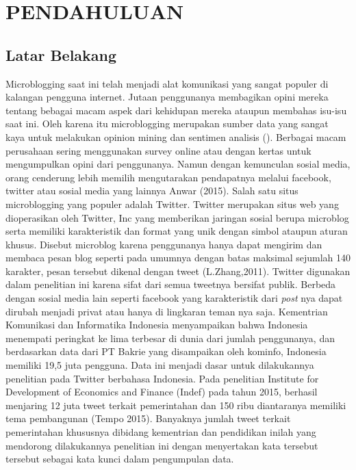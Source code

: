 \section*{PENDAHULUAN} %
\subsection*{Latar Belakang}
Microblogging saat ini telah menjadi alat komunikasi yang sangat populer di kalangan pengguna internet. Jutaan penggunanya membagikan opini mereka tentang bebagai macam aspek dari kehidupan mereka ataupun membahas isu-isu saat ini. Oleh karena itu microblogging merupakan sumber data yang sangat kaya untuk melakukan opinion mining dan sentimen analisis \citeauthor{PAK10.385} (\cite*{PAK10.385}). Berbagai macam perusahaan sering menggunakan survey online atau dengan kertas untuk mengumpulkan opini dari penggunanya. Namun dengan kemunculan sosial media, orang cenderung lebih memilih mengutarakan pendapatnya melalui facebook, twitter atau sosial media yang lainnya Anwar (2015).
Salah satu situs microblogging yang populer adalah Twitter. Twitter merupakan situs web yang dioperasikan oleh Twitter, Inc yang memberikan jaringan sosial berupa microblog serta memiliki karakteristik dan format yang unik dengan simbol ataupun aturan khusus. Disebut microblog karena penggunanya hanya dapat mengirim dan membaca pesan blog seperti pada umumnya dengan batas maksimal sejumlah 140 karakter, pesan tersebut dikenal dengan tweet (L.Zhang,2011). Twitter digunakan dalam penelitian ini karena sifat dari semua tweetnya bersifat publik. Berbeda dengan sosial media lain seperti facebook yang karakteristik dari \textit{post} nya dapat dirubah menjadi privat atau hanya di lingkaran teman nya saja.
Kementrian Komunikasi dan Informatika Indonesia menyampaikan bahwa Indonesia menempati peringkat ke lima terbesar di dunia dari jumlah penggunanya, dan berdasarkan data dari PT Bakrie yang disampaikan oleh kominfo, Indonesia memiliki 19,5 juta pengguna. Data ini menjadi dasar untuk dilakukannya penelitian pada Twitter berbahasa Indonesia. Pada penelitian Institute for Development of Economics and Finance (Indef) pada tahun 2015, berhasil menjaring 12 juta tweet terkait pemerintahan dan 150 ribu diantaranya memiliki tema pembangunan (Tempo 2015). Banyaknya jumlah tweet terkait pemerintahan khususnya dibidang kementrian dan pendidikan inilah yang mendorong dilakukannya penelitian ini dengan menyertakan kata tersebut tersebut sebagai kata kunci dalam pengumpulan data.
